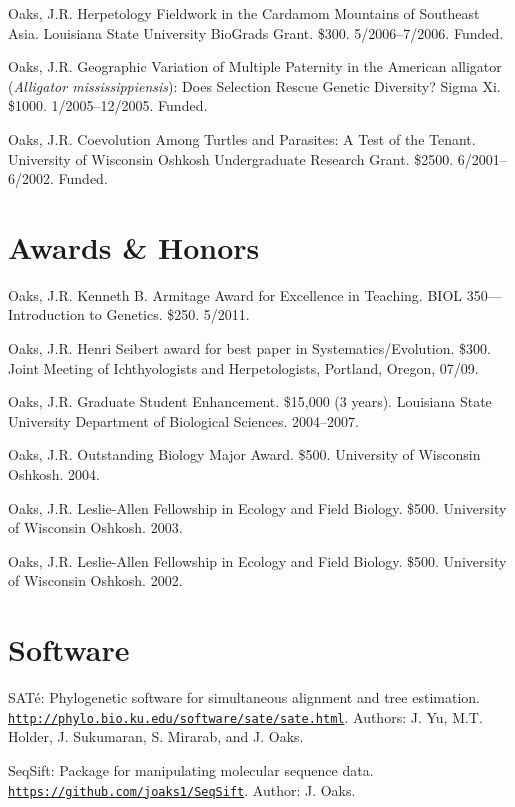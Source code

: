 \documentclass[10pt]{article}
\newcommand{\myHangIndent}{\hangindent=5mm}
\begin{document}
\myHangIndent
Oaks, J.R.
Herpetology Fieldwork in the Cardamom Mountains of Southeast Asia.
Louisiana State University BioGrads Grant.
\$300.
5/2006--7/2006.
Funded.

\myHangIndent
Oaks, J.R.
Geographic Variation of Multiple Paternity in the American alligator
(\emph{Alligator mississippiensis}): Does Selection Rescue Genetic Diversity?
Sigma Xi.
\$1000.
1/2005--12/2005.
Funded.

\myHangIndent
Oaks, J.R.
Coevolution Among Turtles and Parasites: A Test of the Tenant.
University of Wisconsin Oshkosh Undergraduate Research Grant.
\$2500.
6/2001--6/2002.
Funded.

\section*{Awards \& Honors}
\myHangIndent
Oaks, J.R.
Kenneth B. Armitage Award for Excellence in Teaching.
BIOL 350---Introduction to Genetics.
\$250.
5/2011.

\myHangIndent
Oaks, J.R.
Henri Seibert award for best paper in Systematics/Evolution.
\$300.
Joint Meeting of Ichthyologists and Herpetologists, Portland, Oregon, 07/09.

\myHangIndent
Oaks, J.R.
Graduate Student Enhancement.
\$15,000 (3 years).
Louisiana State University Department of Biological Sciences.
2004--2007.

\myHangIndent
Oaks, J.R.
Outstanding Biology Major Award.
\$500.
University of Wisconsin Oshkosh.
2004.

\myHangIndent
Oaks, J.R.
Leslie-Allen Fellowship in Ecology and Field Biology.
\$500.
University of Wisconsin Oshkosh.
2003.

\myHangIndent
Oaks, J.R.
Leslie-Allen Fellowship in Ecology and Field Biology.
\$500.
University of Wisconsin Oshkosh.
2002.

\section*{Software}
\myHangIndent
{SAT}\'{e}: Phylogenetic software for simultaneous alignment and tree
estimation.
\href{http://phylo.bio.ku.edu/software/sate/sate.html}
{\tt http://phylo.bio.ku.edu/software/sate/sate.html}.
Authors: J. Yu, M.T. Holder, J. Sukumaran, S. Mirarab, and J. Oaks.

\myHangIndent
SeqSift: Package for manipulating molecular sequence data.
\href{https://github.com/joaks1/SeqSift}{\tt https://github.com/joaks1/SeqSift}.
Author: J. Oaks.
\end{document}
